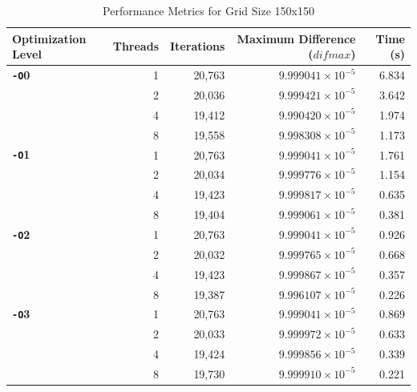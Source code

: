 \documentclass{article}
\begin{document}
\begin{table}[H]
    \centering
    \caption{Performance Metrics for Grid Size 150x150}
    \label{tab:performance_150}
    \begin{tabular}{l r r r r}
    \toprule
    \textbf{Optimization Level} & \textbf{Threads} & \textbf{Iterations} & \textbf{Maximum Difference ($difmax$)} & \textbf{Time (s)} \\
    \midrule
    \textbf{\texttt{-O}0} & 1 & 20,763 & $9.999041 \times 10^{-5}$ & 6.834 \\
        & 2 & 20,036 & $9.999421 \times 10^{-5}$ & 3.642 \\
        & 4 & 19,412 & $9.990420 \times 10^{-5}$ & 1.974 \\
        & 8 & 19,558 & $9.998308 \times 10^{-5}$ & 1.173 \\
    \midrule
    \textbf{\texttt{-O}1} & 1 & 20,763 & $9.999041 \times 10^{-5}$ & 1.761 \\
        & 2 & 20,034 & $9.999776 \times 10^{-5}$ & 1.154 \\
        & 4 & 19,423 & $9.999817 \times 10^{-5}$ & 0.635 \\
        & 8 & 19,404 & $9.999061 \times 10^{-5}$ & 0.381 \\
    \midrule
    \textbf{\texttt{-O}2} & 1 & 20,763 & $9.999041 \times 10^{-5}$ & 0.926 \\
        & 2 & 20,032 & $9.999765 \times 10^{-5}$ & 0.668 \\
        & 4 & 19,423 & $9.999867 \times 10^{-5}$ & 0.357 \\
        & 8 & 19,387 & $9.996107 \times 10^{-5}$ & 0.226 \\
    \midrule
    \textbf{\texttt{-O}3} & 1 & 20,763 & $9.999041 \times 10^{-5}$ & 0.869 \\
        & 2 & 20,033 & $9.999972 \times 10^{-5}$ & 0.633 \\
        & 4 & 19,424 & $9.999856 \times 10^{-5}$ & 0.339 \\
        & 8 & 19,730 & $9.999910 \times 10^{-5}$ & 0.221 \\
    \bottomrule
    \end{tabular}
\end{table}
\end{document}
